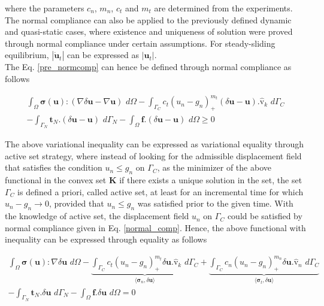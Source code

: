 where the parameters $c_n$, $m_n$, $c_t$ and $m_t$ are determined from the experiments. 
The normal compliance can also be applied to the previously defined dynamic and quasi-static cases, where existence and uniqueness of solution were proved through normal compliance under certain assumptions. 
For steady-sliding equilibrium, $|\bm{\dot{u}}_t|$ can be expressed as $|\bm{{u}}_t|$.\\

The Eq. \eqref{pre_normcomp} can hence be defined through normal compliance as follows

\begin{multline}
\int_{\Omega}  \bm{\sigma}(\bm{u}):(\nabla \delta \bm{u}-\nabla \bm{{u}}) \,\,d\Omega - \int_{\Gamma_C} c_t(u_n-g_n)_+^{m_t}(\delta \bm{u}-\bm{{u}}).\bm{\hat{\mathrm v}}_k \,\, d\Gamma_C\\
  -  \int_{\Gamma_N} \bm{t}_N.(\delta \bm{u}-\bm{{u}}) \,\, d\Gamma_N- \int_{\Omega} \bm{f}.(\delta \bm{u}-\bm{{u}}) \,\, d\Omega \geq 0
\end{multline}

The above variational inequality can be expressed as variational equality through active set strategy, where instead of looking for the admissible displacement field that satisfies the condition ${u}_n \leq g_n$ on $\Gamma_C$, as the minimizer of the above functional in the convex set $\bm K$ if there exists a unique solution in the set, the set $\Gamma_C$ is defined a priori, called active set, at least for an incremental time for which ${u}_n  - g_n \rightarrow 0$, provided that ${u}_n \leq g_n$ was satisfied prior to the given time. 
With the knowledge of active set, the displacement field $u_n$ on $\Gamma_C$ could be satisfied by normal compliance given in Eq. \eqref{normal_comp}.
Hence, the above functional with inequality can be expressed through equality as follows

 \begin{multline}\label{SS_pen}
\int_{\Omega}  \bm{\sigma}(\bm{u}):\nabla \delta \bm{u} \,\,d\Omega - 
\underbrace{\int_{\Gamma_C} c_t(u_n-g_n)_+^{m_t}\delta \bm{u}.\bm{\hat{\mathrm v}}_k \,\, d\Gamma_C}_{{\langle \bm{\sigma}_n, \delta \bm u \rangle}} 
+ \underbrace{\int_{\Gamma_C} c_n(u_n-g_n)_+^{m_n}\delta \bm{u}.\bm{\hat{\mathrm v}}_n \,\, d\Gamma_C}_{{\langle \bm{\sigma}_t, \delta \bm u \rangle}}\\
  -  \int_{\Gamma_N} \bm{t}_N.\delta \bm{u} \,\, d\Gamma_N- \int_{\Omega} \bm{f}.\delta \bm{u} \,\, d\Omega = 0
\end{multline}

